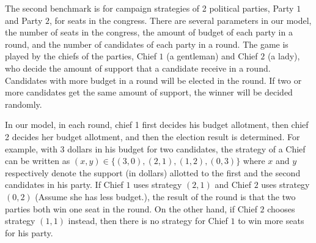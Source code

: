 The second benchmark is for campaign strategies 
of 2 political parties, Party $1$ and Party $2$, for seats in 
the congress.  
There are several parameters in our model, 
the number of seats in the congress, 
the amount of budget of each party in a round, 
and the number of candidates of each party in a round. 
The game is played by the chiefs of the parties, 
Chief $1$ (a gentleman) and Chief $2$ (a lady), 
who decide the amount of support that 
a candidate receive in a round.   
Candidates with more budget in a round will be elected in the round. 
If two or more candidates get the same amount of support, 
the winner will be decided randomly.  

In our model, in each round, chief 1 first decides his budget allotment, 
then chief 2 decides her budget allotment, and 
then the election result is determined.  
For example, with 3 dollars in his budget for two candidates, 
the strategy of a Chief can be written as 
$(x,y)\in\{(3,0), (2,1),(1,2),(0,3)\}$ where $x$ and $y$ 
respectively denote the support (in dollars) 
allotted to the first and the second candidates in his party. 
If Chief $1$ uses strategy $(2,1)$ and 
Chief $2$ uses strategy $(0,2)$ (Assume she has less budget.), 
the result of the round is 
that the two parties both win one seat in the round. 
On the other hand, if Chief $2$ chooses strategy $(1,1)$ instead, 
then there is no strategy for Chief $1$ to win more seats for his party. 

